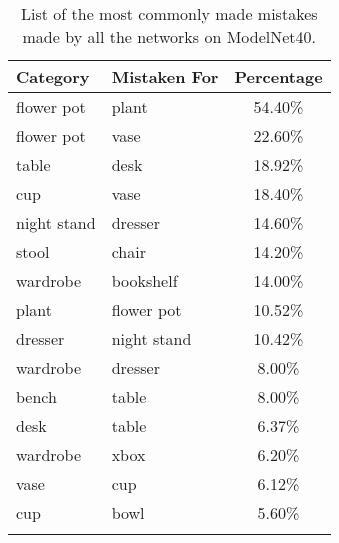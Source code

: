 \begin{table}[]
	\centering
	\begin{tabular}[t]{llc}
		\hline
		\textbf{Category} & \textbf{Mistaken For} & \textbf{Percentage} \\ \hline
		flower pot        & plant                 & 54.40\%             \\
		flower pot        & vase                  & 22.60\%             \\
		table             & desk                  & 18.92\%             \\
		cup               & vase                  & 18.40\%             \\
		night stand       & dresser               & 14.60\%             \\
		stool             & chair                 & 14.20\%             \\
		wardrobe          & bookshelf             & 14.00\%             \\
		plant             & flower pot            & 10.52\%             \\
		dresser           & night stand           & 10.42\%             \\
		wardrobe          & dresser               & 8.00\%              \\
		bench             & table                 & 8.00\%              \\
		desk              & table                 & 6.37\%              \\
		wardrobe          & xbox                  & 6.20\%              \\
		vase              & cup                   & 6.12\%              \\
		cup               & bowl                  & 5.60\%              \\ \hline
		                  &                       &
	\end{tabular}	
	
	\caption{List of the most commonly made mistakes made by all the networks on ModelNet40.}
	\label{Table:mmistakes}
\end{table}